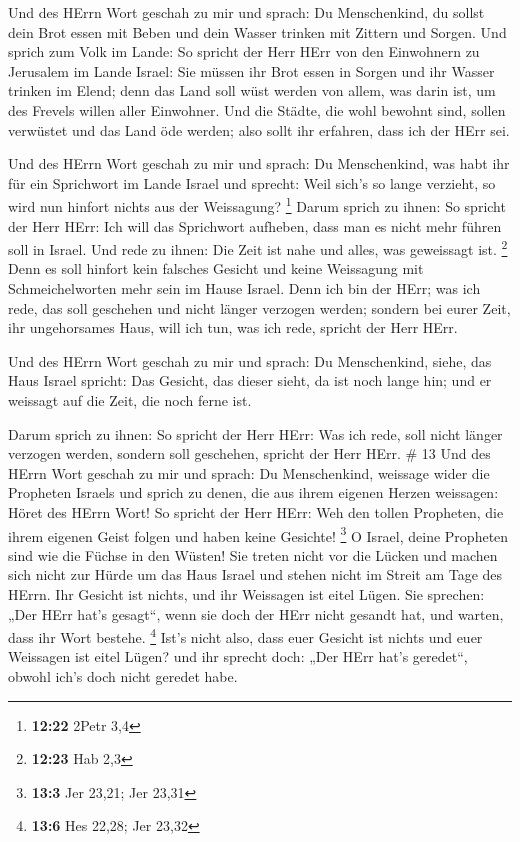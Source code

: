  Und des HErrn Wort geschah zu mir und sprach:
 Du Menschenkind, du sollst dein Brot essen mit Beben und
dein Wasser trinken mit Zittern und Sorgen.  Und sprich zum
Volk im Lande: So spricht der Herr HErr von den Einwohnern zu Jerusalem
im Lande Israel: Sie müssen ihr Brot essen in Sorgen und ihr Wasser
trinken im Elend; denn das Land soll wüst werden von allem, was darin
ist, um des Frevels willen aller Einwohner.  Und die
Städte, die wohl bewohnt sind, sollen verwüstet und das Land öde werden;
also sollt ihr erfahren, dass ich der HErr sei.

 Und des HErrn Wort geschah zu mir und sprach:
 Du Menschenkind, was habt ihr für ein Sprichwort im Lande
Israel und sprecht: Weil sich's so lange verzieht, so wird nun hinfort
nichts aus der Weissagung? \footnote{\textbf{12:22} 2Petr 3,4}
 Darum sprich zu ihnen: So spricht der Herr HErr: Ich will
das Sprichwort aufheben, dass man es nicht mehr führen soll in Israel.
Und rede zu ihnen: Die Zeit ist nahe und alles, was geweissagt ist.
\footnote{\textbf{12:23} Hab 2,3}  Denn es soll hinfort
kein falsches Gesicht und keine Weissagung mit Schmeichelworten mehr
sein im Hause Israel.  Denn ich bin der HErr; was ich rede,
das soll geschehen und nicht länger verzogen werden; sondern bei eurer
Zeit, ihr ungehorsames Haus, will ich tun, was ich rede, spricht der
Herr HErr.

 Und des HErrn Wort geschah zu mir und sprach:
 Du Menschenkind, siehe, das Haus Israel spricht: Das
Gesicht, das dieser sieht, da ist noch lange hin; und er weissagt auf
die Zeit, die noch ferne ist.

 Darum sprich zu ihnen: So spricht der Herr HErr: Was ich
rede, soll nicht länger verzogen werden, sondern soll geschehen, spricht
der Herr HErr. \# 13  Und des HErrn Wort geschah zu mir und
sprach:  Du Menschenkind, weissage wider die Propheten
Israels und sprich zu denen, die aus ihrem eigenen Herzen weissagen:
Höret des HErrn Wort!  So spricht der Herr HErr: Weh den
tollen Propheten, die ihrem eigenen Geist folgen und haben keine
Gesichte! \footnote{\textbf{13:3} Jer 23,21; Jer 23,31}  O
Israel, deine Propheten sind wie die Füchse in den Wüsten! 
Sie treten nicht vor die Lücken und machen sich nicht zur Hürde um das
Haus Israel und stehen nicht im Streit am Tage des HErrn. 
Ihr Gesicht ist nichts, und ihr Weissagen ist eitel Lügen. Sie sprechen:
„Der HErr hat's gesagt``, wenn sie doch der HErr nicht gesandt hat, und
warten, dass ihr Wort bestehe. \footnote{\textbf{13:6} Hes 22,28; Jer
  23,32}  Ist's nicht also, dass euer Gesicht ist nichts und
euer Weissagen ist eitel Lügen? und ihr sprecht doch: „Der HErr hat's
geredet``, obwohl ich's doch nicht geredet habe.


